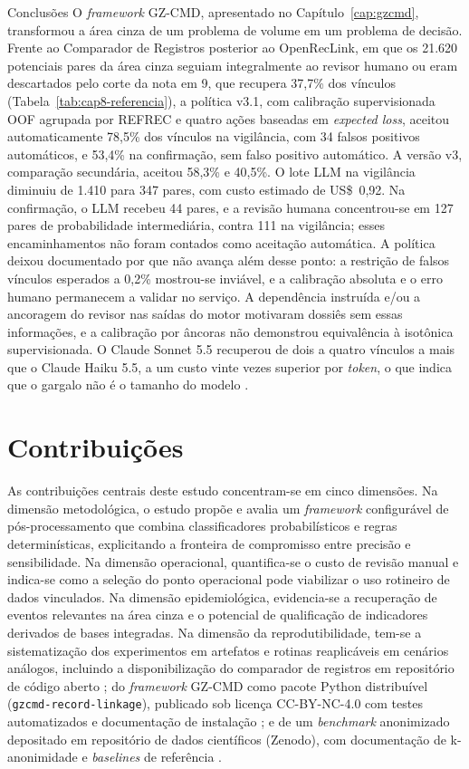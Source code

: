 \begin{chapter}{Conclusões}
O \textit{framework} GZ-CMD, apresentado no Capítulo~\ref{cap:gzcmd}, transformou a área cinza de um problema de volume em um problema de decisão. Frente ao Comparador de Registros posterior ao OpenRecLink, em que os 21.620 potenciais pares da área cinza seguiam integralmente ao revisor humano ou eram descartados pelo corte da nota em 9, que recupera 37,7\% dos vínculos (Tabela~\ref{tab:cap8-referencia}), a política v3.1, com calibração supervisionada OOF agrupada por REFREC e quatro ações baseadas em \textit{expected loss}, aceitou automaticamente 78,5\% dos vínculos na vigilância, com 34 falsos positivos automáticos, e 53,4\% na confirmação, sem falso positivo automático. A versão v3, comparação secundária, aceitou 58,3\% e 40,5\%. O lote LLM na vigilância diminuiu de 1.410 para 347 pares, com custo estimado de US\$~0,92. Na confirmação, o LLM recebeu 44 pares, e a revisão humana concentrou-se em 127 pares de probabilidade intermediária, contra 111 na vigilância; esses encaminhamentos não foram contados como aceitação automática. A política deixou documentado por que não avança além desse ponto: a restrição de falsos vínculos esperados a 0,2\% mostrou-se inviável, e a calibração absoluta e o erro humano permanecem a validar no serviço. A dependência instruída e/ou a ancoragem do revisor nas saídas do motor motivaram dossiês sem essas informações, e a calibração por âncoras não demonstrou equivalência à isotônica supervisionada. O Claude Sonnet 5.5 recuperou de dois a quatro vínculos a mais que o Claude Haiku 5.5, a um custo vinte vezes superior por \textit{token}, o que indica que o gargalo não é o tamanho do modelo \cite{Jardim2026phdrepo}.

\section{Contribuições}
\label{sec:cap7-contribuicoes}

As contribuições centrais deste estudo concentram-se em cinco dimensões. Na dimensão metodológica, o estudo propõe e avalia um \textit{framework} configurável de pós-processamento que combina classificadores probabilísticos e regras determinísticas, explicitando a fronteira de compromisso entre precisão e sensibilidade. Na dimensão operacional, quantifica-se o custo de revisão manual e indica-se como a seleção do ponto operacional pode viabilizar o uso rotineiro de dados vinculados. Na dimensão epidemiológica, evidencia-se a recuperação de eventos relevantes na área cinza e o potencial de qualificação de indicadores derivados de bases integradas. Na dimensão da reprodutibilidade, tem-se a sistematização dos experimentos em artefatos e rotinas reaplicáveis em cenários análogos, incluindo a disponibilização do comparador de registros em repositório de código aberto \cite{Jardim2024comparador}; do \textit{framework} GZ-CMD como pacote Python distribuível (\texttt{gzcmd-record-linkage}), publicado sob licença CC-BY-NC-4.0 com testes automatizados e documentação de instalação \cite{Jardim2026gzcmd}; e de um \textit{benchmark} anonimizado depositado em repositório de dados científicos (Zenodo), com documentação de k-anonimidade e \textit{baselines} de referência \cite{Jardim2026zenodo}.


\end{chapter}
